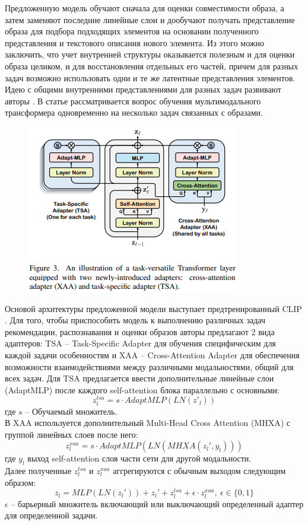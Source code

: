 \documentclass[a4paper,14pt]{extarticle}
\begin{document}
				Предложенную модель обучают сначала для оценки совместимости образа, а затем заменяют последние линейные слои и дообучают получать представление образа для подбора подходящих элементов на основании полученного представления и текстового описания нового элемента. Из этого можно заключить, что учет внутренней структуры оказывается полезным и для оценки образа целиком, и для восстановления отдельных его частей, причем для разных задач возможно использовать одни и те же латентные представления элементов. \\
				
				Идею с общими внутренними представлениями для разных задач развивают авторы \cite{https://doi.org/10.48550/arXiv.2303.02483}. В статье рассматривается вопрос обучения мультимодального трансформера одновременно на несколько задач связанных с образами. 
				
				\begin{figure}
					\includegraphics[scale = 1.0]{pictures/FAME-ViL_acrhitecture.png}
				\end{figure}
				
				Основой архитектуры предложенной модели выступает предтренированный CLIP \cite{https://doi.org/10.48550/arXiv.2103.00020}. Для того, чтобы приспособить модель к выполнению различных задач рекомендации, распознавания и оценки образов авторы предлагают 2 вида адаптеров: TSA -- Task-Specific Adapter для обучения специфическим для каждой задачи особенностям и XAA -- Cross-Attention Adapter для обеспечения возможности взаимодействиями между различными модальностями, общий для всех задач. Для TSA предлагается ввести дополнительные линейные слои (AdaptMLP) после каждого self-attention блока параллельно с основными:
				$$z_l^{tsa}=s \cdot AdaptMLP(LN(z'_l))$$
				где $s$ -- Обучаемый множитель.\\
				В XAA используется дополнительный Multi-Head Cross Attention (MHXA) с группой линейных слоев после него:
				$$z_l^{xaa} = s\cdot AdaptMLP(LN(MHXA(z_l',y_l)))$$
				где $y_l$ выход self-attention слоя части сети для другой модальности.\\
				Далее полученные $z_l^{tsa}$ и $z_l^{xaa}$ аггрегируются с обычным выходом следующим образом:
				$$z_l = MLP(LN(z_l')) + z_l'+z_l^{tsa}+\epsilon\cdot z_l^{xaa},~\epsilon\in\{0,1\}$$
				$\epsilon$ -- барьерный множитель включающий или выключающий определенный адаптер для определенной задачи. 
				
\end{document}
